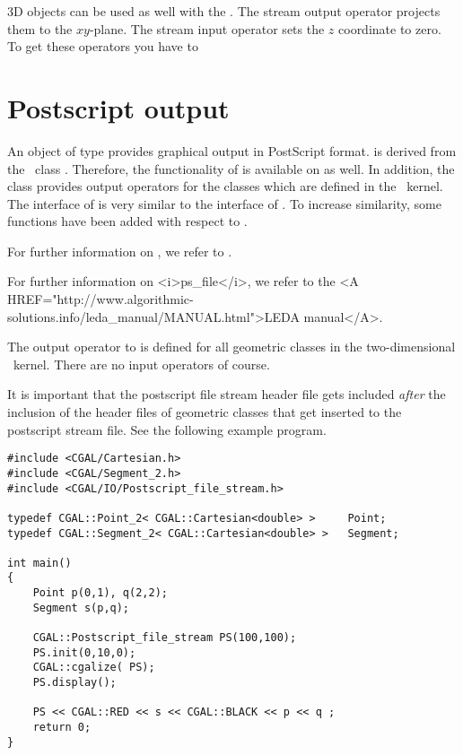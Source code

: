 3D objects can be used as well with the . The stream output
operator \ccc{<<} projects them to the $xy$-plane. The stream input
operator \ccc{>>} sets the $z$ coordinate to zero.
To get these operators you have to 



\section{Postscript output}

An object of type  provides graphical output in PostScript
format.
 is derived from the \leda\ class .
Therefore, the functionality of  is available on 
as well.
In addition, the class  provides output 
operators for the classes which are defined in the \cgal\ kernel.
The interface of  is very similar to the interface 
of . 
To increase similarity, some functions have been added with respect to .
\begin{ccTexOnly}
For further information on , we refer to \cite{cgal:mnsu-lum}.
\end{ccTexOnly}
\begin{ccHtmlOnly}
For further information on <i>ps_file</i>, we refer to the 
<A HREF="http://www.algorithmic-solutions.info/leda_manual/MANUAL.html">LEDA manual</A>.
\end{ccHtmlOnly}

The output operator to  is defined for all geometric classes 
in the two-dimensional \cgal\ kernel. There are no input operators of course.

It is important that the postscript file stream header file gets included
{\em after} the inclusion of the header files of geometric classes
that get inserted to the postscript stream file. See the following example program.

\begin{verbatim}
#include <CGAL/Cartesian.h>
#include <CGAL/Segment_2.h>
#include <CGAL/IO/Postscript_file_stream.h>

typedef CGAL::Point_2< CGAL::Cartesian<double> >     Point;
typedef CGAL::Segment_2< CGAL::Cartesian<double> >   Segment;

int main()
{
    Point p(0,1), q(2,2);
    Segment s(p,q);

    CGAL::Postscript_file_stream PS(100,100);
    PS.init(0,10,0);
    CGAL::cgalize( PS);
    PS.display();

    PS << CGAL::RED << s << CGAL::BLACK << p << q ;
    return 0;
}
\end{verbatim} 

